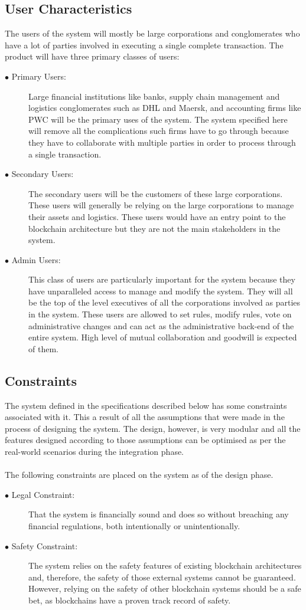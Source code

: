 \documentclass[a4paper,twoside,phd]{BYUPhys}
\begin{document}
\subsection{User Characteristics}
The users of the system will mostly be large corporations and conglomerates who have a lot of parties involved in executing a single complete transaction. The product will have three primary classes of users:
\begin{description}
\item[$\bullet$ Primary Users:] Large financial institutions like banks, supply chain management and logistics conglomerates such as DHL and Maersk, and accounting firms like PWC will be the primary uses of the system. The system specified here will remove all the complications such firms have to go through because they have to collaborate with multiple parties in order to process through a single transaction.
\item[$\bullet$ Secondary Users:] The secondary users will be the customers of these large corporations. These users will generally be relying on the large corporations to manage their assets and logistics. These users would have an entry point to the blockchain architecture but they are not the main stakeholders in the system.
\item[$\bullet$ Admin Users:] This class of users are particularly important for the system because they have unparalleled access to manage and modify the system. They will all be the top of the level executives of all the corporations involved as parties in the system. These users are allowed to set rules, modify rules, vote on administrative changes and can act as the administrative back-end of the entire system. High level of mutual collaboration and goodwill is expected of them. 
\end{description} 
\subsection{Constraints}
The system defined in the specifications described below has some constraints associated with it. This a result of all the assumptions that were made in the process of designing the system. The design, however, is very modular and all the features designed according to those assumptions can be optimised as per the real-world scenarios during the integration phase.
\\
\\
The following constraints are placed on the system as of the design phase.
\begin{description}
\item[$\bullet$ Legal Constraint:] That the system is financially sound and does so without breaching any financial regulations, both intentionally or unintentionally.
\item[$\bullet$ Safety Constraint:] The system relies on the safety features of existing blockchain architectures and, therefore, the safety of those external systems cannot be guaranteed. However, relying on the safety of other blockchain systems should be a safe bet, as blockchains have a proven track record of safety.
\end{description}
\end{document}

